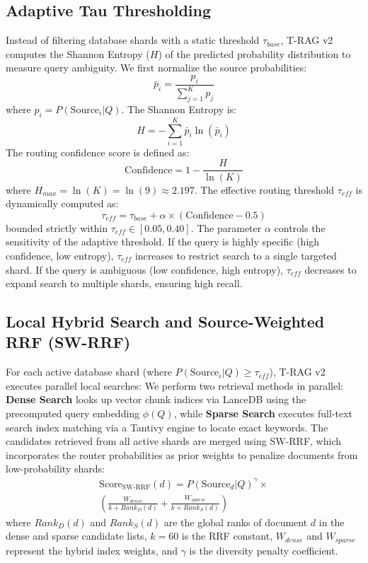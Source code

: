 \documentclass[conference]{IEEEtran}
\begin{document}
\subsection{Adaptive Tau Thresholding}
Instead of filtering database shards with a static threshold $\tau_{base}$, T-RAG v2 computes the Shannon Entropy ($H$) of the predicted probability distribution to measure query ambiguity. We first normalize the source probabilities:
\begin{equation}
    \bar{p}_i = \frac{p_i}{\sum_{j=1}^K p_j}
\end{equation}
where $p_i = P(\text{Source}_i | Q)$. The Shannon Entropy is:
\begin{equation}
    H = - \sum_{i=1}^K \bar{p}_i \ln(\bar{p}_i)
\end{equation}
The routing confidence score is defined as:
\begin{equation}
    \text{Confidence} = 1 - \frac{H}{\ln(K)}
\end{equation}
where $H_{max} = \ln(K) = \ln(9) \approx 2.197$. The effective routing threshold $\tau_{eff}$ is dynamically computed as:
\begin{equation}
    \tau_{eff} = \tau_{base} + \alpha \times (\text{Confidence} - 0.5)
\end{equation}
bounded strictly within $\tau_{eff} \in [0.05, 0.40]$. The parameter $\alpha$ controls the sensitivity of the adaptive threshold. If the query is highly specific (high confidence, low entropy), $\tau_{eff}$ increases to restrict search to a single targeted shard. If the query is ambiguous (low confidence, high entropy), $\tau_{eff}$ decreases to expand search to multiple shards, ensuring high recall.

\subsection{Local Hybrid Search and Source-Weighted RRF (SW-RRF)}
For each active database shard (where $P(\text{Source}_i | Q) \geq \tau_{eff}$), T-RAG v2 executes parallel local searches:
We perform two retrieval methods in parallel: \textbf{Dense Search} looks up vector chunk indices via LanceDB using the precomputed query embedding $\phi(Q)$, while \textbf{Sparse Search} executes full-text search index matching via a Tantivy engine to locate exact keywords.
The candidates retrieved from all active shards are merged using SW-RRF, which incorporates the router probabilities as prior weights to penalize documents from low-probability shards:
\begin{equation}
\begin{split}
    \text{Score}_{\text{SW-RRF}}(d) = P(\text{Source}_d | Q)^{\gamma} \times \\
    \left( \frac{W_{dense}}{k + Rank_{D}(d)} + \frac{W_{sparse}}{k + Rank_{S}(d)} \right)
\end{split}
\end{equation}
where $Rank_D(d)$ and $Rank_S(d)$ are the global ranks of document $d$ in the dense and sparse candidate lists, $k=60$ is the RRF constant, $W_{dense}$ and $W_{sparse}$ represent the hybrid index weights, and $\gamma$ is the diversity penalty coefficient.
\end{document}
